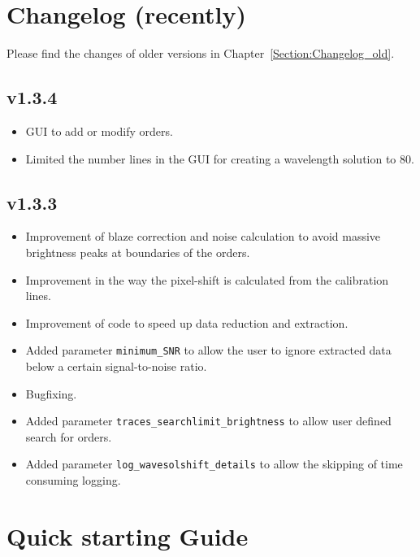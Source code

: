 \documentclass[10pt,a4paper]{article}
\begin{document}
\newpage

\section{Changelog (recently)}
\label{Section:Changelog_new}
Please find the changes of older versions in Chapter~\ref{Section:Changelog_old}.

\subsection*{v1.3.4}
\begin{itemize}\setlength\itemsep{0em}
  \item GUI to add or modify orders.
  \item Limited the number lines in the GUI for creating a wavelength solution to 80.
\end{itemize}

\subsection*{v1.3.3}
\begin{itemize}\setlength\itemsep{0em}
  \item Improvement of blaze correction and noise calculation to avoid massive brightness peaks at boundaries of the orders.
  \item Improvement in the way the pixel-shift is calculated from the calibration lines.
  \item Improvement of code to speed up data reduction and extraction.
  \item Added parameter \verb|minimum_SNR| to allow the user to ignore extracted data below a certain signal-to-noise ratio.
  \item Bugfixing.
  \item Added parameter \verb|traces_searchlimit_brightness| to allow user defined search for orders.
  \item Added parameter \verb|log_wavesolshift_details| to allow the skipping of time consuming logging.
\end{itemize}


\section{Quick starting Guide}
\end{document}
